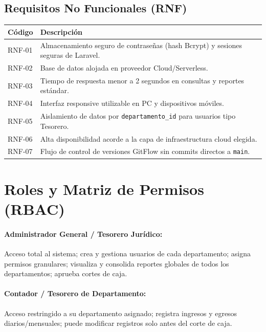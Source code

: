 \documentclass[11pt,a4paper]{article}
\begin{document}
	\subsection{Requisitos No Funcionales (RNF)}
	\begin{table}[h!]
		\centering
		\renewcommand{\arraystretch}{1.1}
		\begin{tabularx}{\textwidth}{l X}
			\toprule
			\textbf{Código} & \textbf{Descripción} \\
			\midrule
			RNF-01 & Almacenamiento seguro de contraseñas (hash Bcrypt) y sesiones seguras de Laravel. \\
			RNF-02 & Base de datos alojada en proveedor Cloud/Serverless. \\
			RNF-03 & Tiempo de respuesta menor a 2 segundos en consultas y reportes estándar. \\
			RNF-04 & Interfaz responsive utilizable en PC y dispositivos móviles. \\
			RNF-05 & Aislamiento de datos por \texttt{departamento\_id} para usuarios tipo Tesorero. \\
			RNF-06 & Alta disponibilidad acorde a la capa de infraestructura cloud elegida. \\
			RNF-07 & Flujo de control de versiones GitFlow sin commits directos a \texttt{main}. \\
			\bottomrule
		\end{tabularx}
	\end{table}
	
	\newpage
	\section{Roles y Matriz de Permisos (RBAC)}
	
	\paragraph{Administrador General / Tesorero Jurídico:} Acceso total al sistema; crea y gestiona usuarios de cada departamento; asigna permisos granulares; visualiza y consolida reportes globales de todos los departamentos; aprueba cortes de caja.
	
	\paragraph{Contador / Tesorero de Departamento:} Acceso restringido a su departamento asignado; registra ingresos y egresos diarios/mensuales; puede modificar registros solo antes del corte de caja.
	
\end{document}
